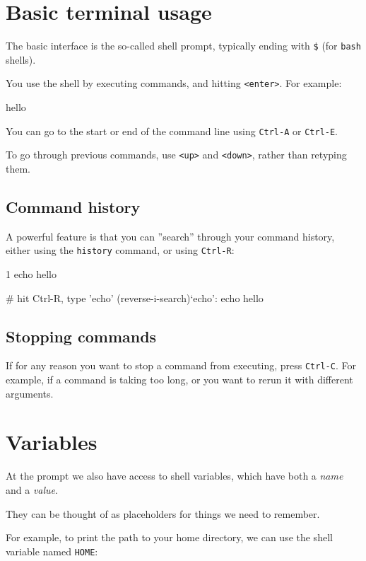 \section{Basic terminal usage}

The basic interface is the so-called shell prompt, typically ending with \lstinline|$|
(for \lstinline|bash| shells).

You use the shell by executing commands, and hitting \lstinline|<enter>|. For example:

\begin{prompt}
hello
\end{prompt}

You can go to the start or end of the command line using \lstinline|Ctrl-A| or \lstinline|Ctrl-E|.

To go through previous commands, use \lstinline|<up>| and \lstinline|<down>|, rather than retyping them.

\subsection{Command history}

A powerful feature is that you can ''search'' through your command history, either using the \lstinline|history| command, or using \lstinline|Ctrl-R|:

\begin{prompt}
    1  echo hello

# hit Ctrl-R, type 'echo'
(reverse-i-search)`echo': echo hello
\end{prompt}

\subsection{Stopping commands}
If for any reason you want to stop a command from executing, press \lstinline|Ctrl-C|. For
example, if a command is taking too long, or you want to rerun it with different arguments.

\section{Variables}

At the prompt we also have access to shell variables, which have both a \emph{name} and a \emph{value}.

They can be thought of as placeholders for things we need to remember.

For example, to print the path to your home directory, we can use the shell variable named \lstinline|HOME|:

